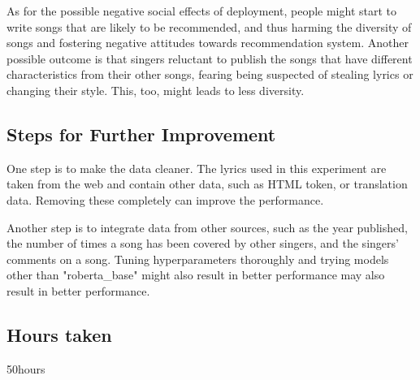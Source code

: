 \documentclass[a4paper,11pt]{article}
\begin{document}
As for the possible negative social effects of deployment, people might start to write songs that 
are likely to be recommended, and thus harming the diversity of songs and fostering negative attitudes towards recommendation system.
Another possible outcome is that singers reluctant to publish the songs that have different characteristics from their other songs,
fearing being suspected of stealing lyrics or changing their style.
This, too, might leads to less diversity.

\subsection{Steps for Further Improvement}
One step is to make the data cleaner.
The lyrics used in this experiment are taken from the web and contain other data, such as 
HTML token, or translation data. 
Removing these completely can improve the performance.

Another step is to integrate data from other sources, such as the year published, the number of times a song has been covered by other singers, and the singers' comments on a song.
Tuning hyperparameters thoroughly and trying models other than "roberta\_base" might also result in better performance may also result in better performance.

\subsection{Hours taken}
50hours
\end{document}
